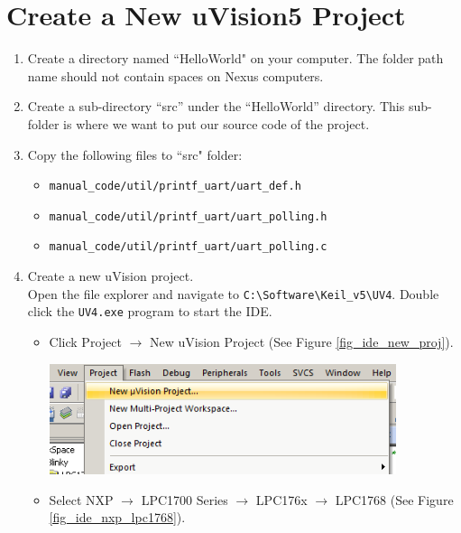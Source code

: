\section{Create a New uVision5 Project}
\begin{enumerate}
    \item Create a directory named ``HelloWorld" on your computer. The folder path name should not contain spaces on Nexus computers.
    \item Create a sub-directory ``src'' under the ``HelloWorld'' directory. This sub-folder is where we want to put our source code of the project. 
    \item Copy the following files to ``src" folder:
    \begin{itemize}
        \item \verb+manual_code/util/printf_uart/uart_def.h+
        \item \verb+manual_code/util/printf_uart/uart_polling.h+
        \item \verb+manual_code/util/printf_uart/uart_polling.c+
    \end{itemize}
    \item Create a new uVision project.\\ 
Open the file explorer and navigate to \verb+C:\Software\Keil_v5\UV4+. Double click the \verb+UV4.exe+ program to start the IDE.
    \begin{itemize}
        \item Click Project $\rightarrow$ New uVision Project (See Figure \ref{fig_ide_new_proj}). \par
          \begin{minipage}[t]{\linewidth}
            \centering
            \includegraphics[width=4in]{figure/IDE_new_proj}
            \label{fig_ide_new_proj}
           \end{minipage}
        \item Select NXP $\rightarrow$ LPC1700 Series $\rightarrow$ LPC176x $\rightarrow$ LPC1768 (See Figure \ref{fig_ide_nxp_lpc1768}). \par


\end{itemize}
\end{enumerate}
